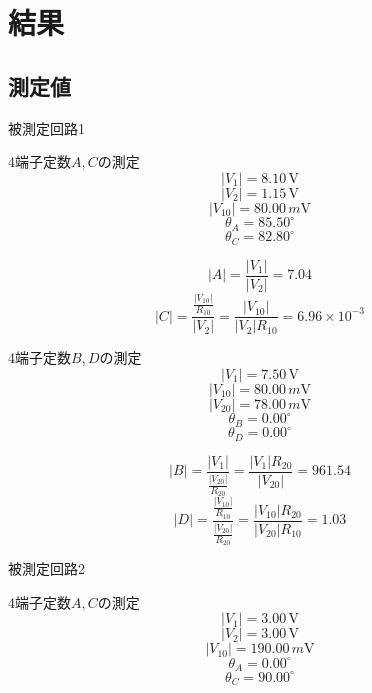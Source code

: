 
\section{結果}
\subsection*{測定値}
    \begin{description}
        \item 被測定回路1
        \begin{description}
            \item 4端子定数$A,C$の測定
            $$
            |V_1|=8.10\,\si{\volt}
            $$
            $$
            |V_2|=1.15\,\si{\volt}
            $$
            $$
            |V_{10}|=80.00\,\si{m\volt}
            $$
            $$
            \theta_A=85.50^\circ
            $$
            $$
            \theta_C=82.80^\circ
            $$

            $$
            |A|=\frac{\left|V_1\right|}{\left|V_2\right|}=7.04
            $$
            $$
            |C|=\frac{\frac{\left|V_{10}\right|}{R_{10}}}{\left|V_2\right|}=\frac{\left|V_{10}\right|}{\left|V_2\right| R_{10}}=6.96\times10^{-3}
            $$

            \item 4端子定数$B,D$の測定
            $$
            |V_1|=7.50\,\si{\volt}
            $$
            $$
            |V_{10}|=80.00\,\si{m\volt}
            $$
            $$
            |V_{20}|=78.00\,\si{m\volt}
            $$
            $$
            \theta_B=0.00^\circ
            $$
            $$
            \theta_D=0.00^\circ
            $$

            $$
            |B|=\frac{\left|V_1\right|}{\frac{\left|V_{20}\right|}{R_{20}}}=\frac{\left|V_1\right| R_{20}}{\left|V_{20}\right|}=961.54
            $$
            $$
            |D|=\frac{\frac{\left|V_{10}\right|}{R_{10}}}{\frac{\left|V_{20}\right|}{R_{20}}}=\frac{\left|V_{10}\right| R_{20}}{\left|V_{20}\right| R_{10}}=1.03
            $$

        \end{description}

        \newpage
        
        \item 被測定回路2
        \begin{description}
            \item 4端子定数$A,C$の測定
            $$
            |V_1|=3.00\,\si{\volt}
            $$
            $$
            |V_2|=3.00\,\si{\volt}
            $$
            $$
            |V_{10}|=190.00\,\si{m\volt}
            $$
            $$
            \theta_A=0.00^\circ
            $$
            $$
            \theta_C=90.00^\circ
            $$


\end{description}
\end{description}
